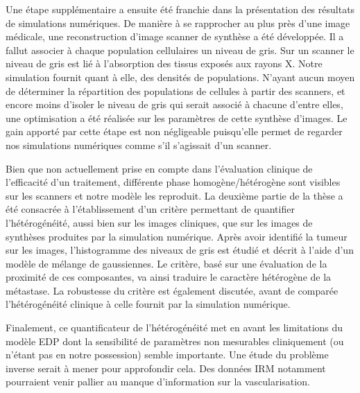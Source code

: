 \documentclass[12pt,a4paper]{article}
\newcommand{\hetero}{hétérogénéité\xspace}
\newcommand{\heterogene}{hétérogène\xspace}
\newcommand{\twinweno}{twin-WENO5\xspace}
\begin{document}


Une étape supplémentaire a ensuite été franchie dans la présentation des résultats de simulations numériques. 
De manière à se rapprocher au plus près d'une image médicale,  une reconstruction d'image scanner de synthèse a été développée. 
Il a fallut associer à chaque population cellulaires un niveau de gris. 
Sur un scanner le niveau de gris est lié à l'absorption des tissus exposés aux rayons X. 
Notre simulation fournit quant à elle, des densités de populations. N'ayant aucun moyen de déterminer la répartition des populations de cellules à partir des scanners, et encore moins d'isoler le niveau de gris qui serait associé à chacune d'entre elles, une optimisation a été réalisée sur les paramètres de cette synthèse d'images. 
Le gain apporté par cette étape est non négligeable puisqu'elle permet %
de regarder nos simulations numériques comme s'il 
s'agissait d'un scanner. 


Bien que non actuellement prise en compte dans l'évaluation clinique de l'efficacité d'un traitement, différente phase homogène/\heterogene sont visibles sur les scanners et notre modèle les reproduit.
La deuxième partie de la thèse a été consacrée à l'établissement d'un critère permettant de quantifier l'\hetero, aussi bien sur les images cliniques, que sur les images de synthèses produites par la simulation numérique. 
Après avoir identifié la tumeur sur les images, l'histogramme des niveaux de gris est étudié et décrit à l'aide 
d'un modèle de mélange de gaussiennes. 
Le critère, basé sur une évaluation de la proximité de ces %
composantes, va ainsi traduire le caractère \heterogene de la métastase. 
La robustesse du critère est également discutée, avant de comparée l'\hetero clinique à celle fournit par la simulation numérique. 


Finalement, ce quantificateur de l'\hetero met en avant les limitations du modèle EDP dont la sensibilité de paramètres non mesurables cliniquement (ou n'étant pas en notre possession) semble importante. Une étude du problème inverse serait à mener pour approfondir cela. Des données IRM notamment pourraient venir pallier au manque d'information sur la vascularisation.
\end{document}
